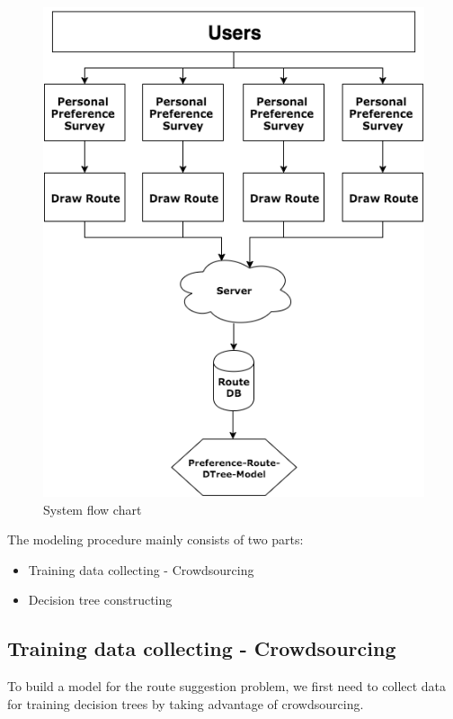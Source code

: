 \documentclass{sigchi}
\begin{document}
\begin{figure}[!h]
\centering
\includegraphics[width=1.0\columnwidth]{pics/work-flow.png}
\caption{System flow chart}
\label{fig:systemflow}
\end{figure}

The modeling procedure mainly consists of two parts:
\begin{itemize}
\item Training data collecting - Crowdsourcing
\item Decision tree constructing
\end{itemize}

\subsection{Training data collecting - Crowdsourcing}

To build a model for the route suggestion problem, we first need to collect data for training decision trees by taking advantage of crowdsourcing.
\end{document}

